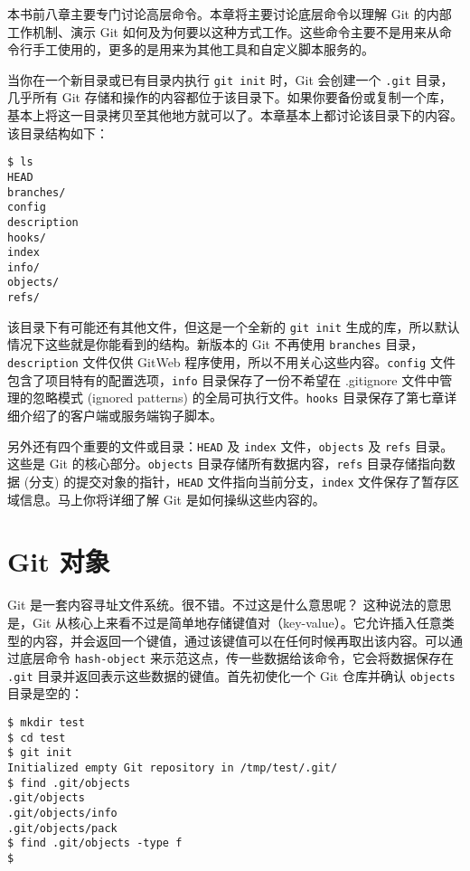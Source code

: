 \documentclass[a4paper]{book}
\begin{document}
本书前八章主要专门讨论高层命令。本章将主要讨论底层命令以理解 Git 的内部工作机制、演示 Git 如何及为何要以这种方式工作。这些命令主要不是用来从命令行手工使用的，更多的是用来为其他工具和自定义脚本服务的。

当你在一个新目录或已有目录内执行 \texttt{git init} 时，Git 会创建一个 \texttt{.git} 目录，几乎所有 Git 存储和操作的内容都位于该目录下。如果你要备份或复制一个库，基本上将这一目录拷贝至其他地方就可以了。本章基本上都讨论该目录下的内容。该目录结构如下：

\begin{shaded}\begin{verbatim}
$ ls
HEAD
branches/
config
description
hooks/
index
info/
objects/
refs/
\end{verbatim}\end{shaded}

该目录下有可能还有其他文件，但这是一个全新的 \texttt{git init} 生成的库，所以默认情况下这些就是你能看到的结构。新版本的 Git 不再使用 \texttt{branches} 目录，\texttt{description} 文件仅供 GitWeb 程序使用，所以不用关心这些内容。\texttt{config} 文件包含了项目特有的配置选项，\texttt{info} 目录保存了一份不希望在 .gitignore 文件中管理的忽略模式 (ignored patterns) 的全局可执行文件。\texttt{hooks} 目录保存了第七章详细介绍了的客户端或服务端钩子脚本。

另外还有四个重要的文件或目录：\texttt{HEAD} 及 \texttt{index} 文件，\texttt{objects} 及 \texttt{refs} 目录。这些是 Git 的核心部分。\texttt{objects} 目录存储所有数据内容，\texttt{refs} 目录存储指向数据 (分支) 的提交对象的指针，\texttt{HEAD} 文件指向当前分支，\texttt{index} 文件保存了暂存区域信息。马上你将详细了解 Git 是如何操纵这些内容的。

\section{Git 对象}

Git 是一套内容寻址文件系统。很不错。不过这是什么意思呢？ 这种说法的意思是，Git 从核心上来看不过是简单地存储键值对（key-value）。它允许插入任意类型的内容，并会返回一个键值，通过该键值可以在任何时候再取出该内容。可以通过底层命令 \texttt{hash-object} 来示范这点，传一些数据给该命令，它会将数据保存在 \texttt{.git} 目录并返回表示这些数据的键值。首先初使化一个 Git 仓库并确认 \texttt{objects} 目录是空的：

\begin{shaded}\begin{verbatim}
$ mkdir test
$ cd test
$ git init
Initialized empty Git repository in /tmp/test/.git/
$ find .git/objects
.git/objects
.git/objects/info
.git/objects/pack
$ find .git/objects -type f
$
\end{verbatim}\end{shaded}
\end{document}
